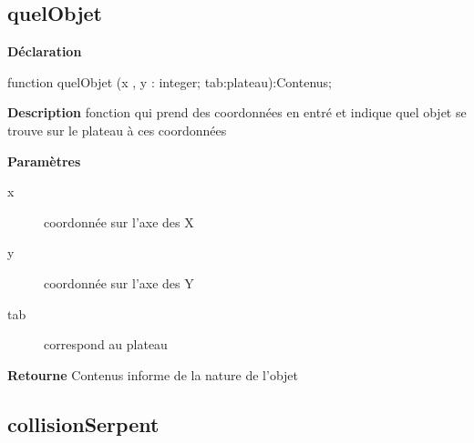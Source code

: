 \documentclass{report}
\newif\ifpdf
\begin{document}
\subsection*{quelObjet}
\fi
\label{Deplacement-quelObjet}
\begin{list}{}{
\setlength{\itemindent}{0cm}
\setlength{\listparindent}{0cm}
\setlength{\leftmargin}{\evensidemargin}
\addtolength{\leftmargin}{\tmplength}
\settowidth{\labelsep}{X}
\addtolength{\leftmargin}{\labelsep}
\setlength{\labelwidth}{\tmplength}
}
\item[\textbf{Déclaration}\hfill]
\ifpdf
\begin{flushleft}
\fi
\begin{ttfamily}
function quelObjet (x , y : integer; tab:plateau):Contenus;\end{ttfamily}

\ifpdf
\end{flushleft}
\fi

\par
\item[\textbf{Description}]
fonction qui prend des coordonnées en entré et indique quel objet se trouve sur le plateau à ces coordonnées    \par
\item[\textbf{Paramètres}]
\begin{description}
\item[x] coordonnée sur l'axe des X
\item[y] coordonnée sur l'axe des Y
\item[tab] correspond au plateau
\end{description}
\item[\textbf{Retourne}]Contenus informe de la nature de l'objet


\end{list}
\ifpdf
\subsection*{\large{\textbf{collisionSerpent}}\normalsize\hspace{1ex}\hrulefill}
\else
\end{document}
